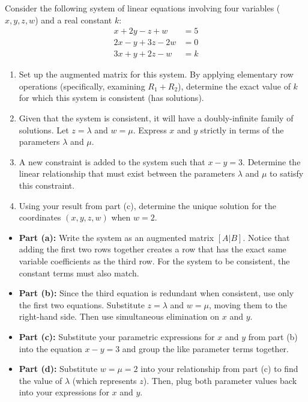 \begin{problem}
Consider the following system of linear equations involving four variables ($x, y, z, w$) and a real constant $k$:
\begin{align*}
x + 2y - z + w &= 5 \\
2x - y + 3z - 2w &= 0 \\
3x + y + 2z - w &= k
\end{align*}

\begin{enumerate}[label=\textbf{(\alph*)}]
    \item Set up the augmented matrix for this system. By applying elementary row operations (specifically, examining $R_1 + R_2$), determine the exact value of $k$ for which this system is consistent (has solutions).
    \item Given that the system is consistent, it will have a doubly-infinite family of solutions. Let $z = \lambda$ and $w = \mu$. Express $x$ and $y$ strictly in terms of the parameters $\lambda$ and $\mu$.
    \item A new constraint is added to the system such that $x - y = 3$. Determine the linear relationship that must exist between the parameters $\lambda$ and $\mu$ to satisfy this constraint.
    \item Using your result from part (c), determine the unique solution for the coordinates $(x, y, z, w)$ when $w = 2$.
\end{enumerate}
\end{problem}

\begin{hint}
\begin{itemize}
    \item \textbf{Part (a):} Write the system as an augmented matrix $[A|B]$. Notice that adding the first two rows together creates a row that has the exact same variable coefficients as the third row. For the system to be consistent, the constant terms must also match.
    \item \textbf{Part (b):} Since the third equation is redundant when consistent, use only the first two equations. Substitute $z = \lambda$ and $w = \mu$, moving them to the right-hand side. Then use simultaneous elimination on $x$ and $y$.
    \item \textbf{Part (c):} Substitute your parametric expressions for $x$ and $y$ from part (b) into the equation $x - y = 3$ and group the like parameter terms together.
    \item \textbf{Part (d):} Substitute $w = \mu = 2$ into your relationship from part (c) to find the value of $\lambda$ (which represents $z$). Then, plug both parameter values back into your expressions for $x$ and $y$.
\end{itemize}
\end{hint}

